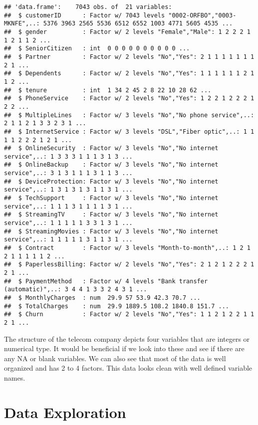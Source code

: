 \documentclass[]{article}
\begin{document}
\begin{verbatim}
## 'data.frame':    7043 obs. of  21 variables:
##  $ customerID      : Factor w/ 7043 levels "0002-ORFBO","0003-MKNFE",..: 5376 3963 2565 5536 6512 6552 1003 4771 5605 4535 ...
##  $ gender          : Factor w/ 2 levels "Female","Male": 1 2 2 2 1 1 2 1 1 2 ...
##  $ SeniorCitizen   : int  0 0 0 0 0 0 0 0 0 0 ...
##  $ Partner         : Factor w/ 2 levels "No","Yes": 2 1 1 1 1 1 1 1 2 1 ...
##  $ Dependents      : Factor w/ 2 levels "No","Yes": 1 1 1 1 1 1 2 1 1 2 ...
##  $ tenure          : int  1 34 2 45 2 8 22 10 28 62 ...
##  $ PhoneService    : Factor w/ 2 levels "No","Yes": 1 2 2 1 2 2 2 1 2 2 ...
##  $ MultipleLines   : Factor w/ 3 levels "No","No phone service",..: 2 1 1 2 1 3 3 2 3 1 ...
##  $ InternetService : Factor w/ 3 levels "DSL","Fiber optic",..: 1 1 1 1 2 2 2 1 2 1 ...
##  $ OnlineSecurity  : Factor w/ 3 levels "No","No internet service",..: 1 3 3 3 1 1 1 3 1 3 ...
##  $ OnlineBackup    : Factor w/ 3 levels "No","No internet service",..: 3 1 3 1 1 1 3 1 1 3 ...
##  $ DeviceProtection: Factor w/ 3 levels "No","No internet service",..: 1 3 1 3 1 3 1 1 3 1 ...
##  $ TechSupport     : Factor w/ 3 levels "No","No internet service",..: 1 1 1 3 1 1 1 1 3 1 ...
##  $ StreamingTV     : Factor w/ 3 levels "No","No internet service",..: 1 1 1 1 1 3 3 1 3 1 ...
##  $ StreamingMovies : Factor w/ 3 levels "No","No internet service",..: 1 1 1 1 1 3 1 1 3 1 ...
##  $ Contract        : Factor w/ 3 levels "Month-to-month",..: 1 2 1 2 1 1 1 1 1 2 ...
##  $ PaperlessBilling: Factor w/ 2 levels "No","Yes": 2 1 2 1 2 2 2 1 2 1 ...
##  $ PaymentMethod   : Factor w/ 4 levels "Bank transfer (automatic)",..: 3 4 4 1 3 3 2 4 3 1 ...
##  $ MonthlyCharges  : num  29.9 57 53.9 42.3 70.7 ...
##  $ TotalCharges    : num  29.9 1889.5 108.2 1840.8 151.7 ...
##  $ Churn           : Factor w/ 2 levels "No","Yes": 1 1 2 1 2 2 1 1 2 1 ...
\end{verbatim}

The structure of the telecom company depicts four variables that are
integers or numerical type. It would be beneficial if we look into these
and see if there are any NA or blank variables. We can also see that
most of the data is well organized and has 2 to 4 factors. This data
looks clean with well defined variable names.

\section{Data Exploration}\label{data-exploration}
\end{document}
